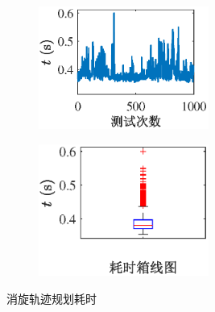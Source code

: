 \documentclass[lang=chs, degree=master, blindreview=false, winfonts=true]{yanputhesis}
\begin{document}
\begin{figure}[htb!]
	\centering
	\begin{minipage}[t]{0.96\textwidth}
		\centering
		\begin{subfigure}[t]{0.47\textwidth}
			\centering
			\includegraphics[width = 2.2in]{picture/plantimeconsum.eps}
			\caption{ }
			\label{fig:plantimeconsum}
		\end{subfigure}\hfill
		\begin{subfigure}[t]{0.47\textwidth}
			\centering
			\includegraphics[width = 2.2in]{picture/plantimeconsum_boxline.eps}
			\caption{ }
			\label{fig:plantimeconsum_boxline}
		\end{subfigure}
	\end{minipage}
	\caption{消旋轨迹规划耗时\label{Fig.PlantimeConsum}}
\end{figure}
\end{document}
